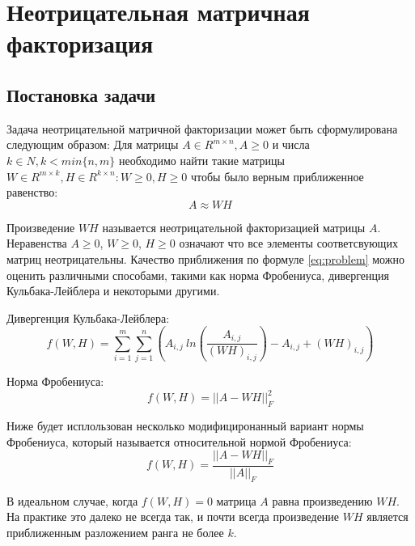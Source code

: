 
\chapter{Неотрицательная матричная факторизация}





\section{Постановка задачи}

Задача неотрицательной матричной факторизации может быть сформулирована следующим образом:
Для матрицы $A \in R^{m \times n}, A \geq 0$ и числа $k \in N, k < min\{n, m\}$
необходимо найти  такие матрицы $W \in R^{m \times k}, H \in R^{k \times n} : W \geq 0, H \geq 0$ чтобы было верным приближенное равенство:
\begin{equation} \label{eq:problem}
  A \approx W H
\end{equation}

Произведение $WH$ называется неотрицательной факторизацией матрицы $A$. Неравенства $A \geq 0$, $W \geq 0$, $H \geq 0$ означают что все элементы соответсвующих матриц неотрицательны.
Качество приближения по формуле \ref{eq:problem} можно оценить различными способами, такими как норма Фробениуса,
дивергенция Кульбака-Лейблера и некоторыми другими.

Дивергенция Кульбака-Лейблера:
\begin{equation*}
  f(W, H) =
    \sum_{i=1}^m \sum_{j=1}^n
    \left(
      A_{i,j} \
      ln\left(
        \frac{A_{i,j}}{(WH)_{i,j}}
      \right)
      - A_{i,j}
      + (WH)_{i,j}
    \right)
\end{equation*}

Норма Фробениуса:
\begin{equation*}
  f(W, H) = || A - WH ||^2_F
\end{equation*}

Ниже будет исплользован несколько модифициронанный вариант нормы Фробениуса,
который называется относительной нормой Фробениуса:
\begin{equation} \label{eq:frob_norm}
  f(W, H) = \dfrac{||A - WH||_F}{|| A ||_F}
\end{equation}

В идеальном случае, когда $f(W,H)=0$ матрица $A$ равна произведению $WH$.
На практике это далеко не всегда так, и почти всегда произведение $WH$ является приближенным разложением ранга не более $k$.

